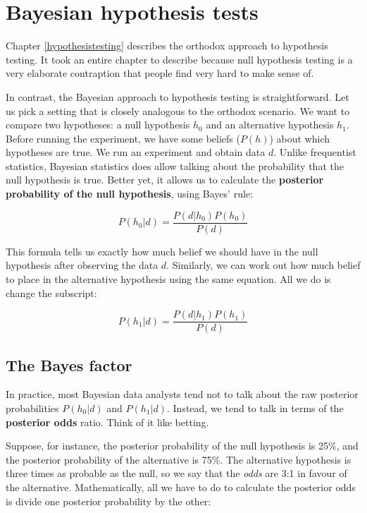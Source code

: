\documentclass[
]{book}
\theoremstyle{definition}
\theoremstyle{definition}
\theoremstyle{definition}
\theoremstyle{definition}
\theoremstyle{remark}
\begin{document}
\hypertarget{bayesianhypothesistests}{%
\chapter{Bayesian hypothesis tests}\label{bayesianhypothesistests}}

Chapter \ref{hypothesistesting} describes the orthodox approach to hypothesis testing. It took an entire chapter to describe because null hypothesis testing is a very elaborate contraption that people find very hard to make sense of.

In contrast, the Bayesian approach to hypothesis testing is straightforward. Let us pick a setting that is closely analogous to the orthodox scenario. We want to compare two hypotheses: a null hypothesis \(h_0\) and an alternative hypothesis \(h_1\). Before running the experiment, we have some beliefs (\(P(h)\)) about which hypotheses are true. We run an experiment and obtain data \(d\). Unlike frequentist statistics, Bayesian statistics does allow talking about the probability that the null hypothesis is true. Better yet, it allows us to calculate the \textbf{posterior probability of the null hypothesis}, using Bayes' rule:

\[
P(h_0 | d) = \frac{P(d|h_0) P(h_0)}{P(d)}
\]

This formula tells us exactly how much belief we should have in the null hypothesis after observing the data \(d\). Similarly, we can work out how much belief to place in the alternative hypothesis using the same equation. All we do is change the subscript:

\[
P(h_1 | d) = \frac{P(d|h_1) P(h_1)}{P(d)}
\]

\hypertarget{the-bayes-factor}{%
\section{The Bayes factor}\label{the-bayes-factor}}

In practice, most Bayesian data analysts tend not to talk about the raw posterior probabilities \(P(h_0|d)\) and \(P(h_1|d)\). Instead, we tend to talk in terms of the \textbf{posterior odds} ratio. Think of it like betting.

Suppose, for instance, the posterior probability of the null hypothesis is 25\%, and the posterior probability of the alternative is 75\%. The alternative hypothesis is three times as probable as the null, so we say that the \emph{odds} are 3:1 in favour of the alternative. Mathematically, all we have to do to calculate the posterior odds is divide one posterior probability by the other:
\end{document}
